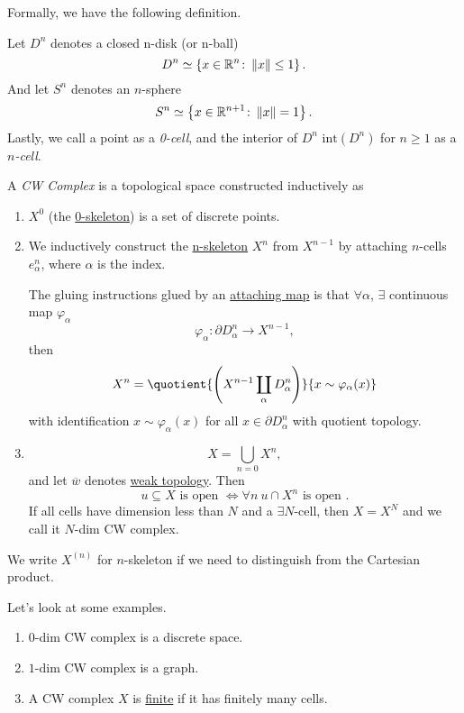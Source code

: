 \hr

Formally, we have the following definition.
\begin{notation}
	Let \(D^n\) denotes a closed n-disk (or n-ball)
	\[
		D^n\simeq \left\{x\in\mathbb{\MakeUppercase{R}} ^n\colon \left\lVert x\right\rVert \leq 1\right\}.
	\]
	And let \(S^n\) denotes an \(n\)-sphere
	\[
		S^n\simeq \left\{x\in \mathbb{\MakeUppercase{R}}^{n+1}\colon \left\lVert x\right\rVert = 1\right\}.
	\]
	Lastly, we call a point as a \emph{0-cell}, and the interior of \(D^n\) \(\mathrm{int}(D^n)\) for \(n\geq 1\) as a \emph{\(n\)-cell}.
\end{notation}
\begin{definition}[CW Complex]
	A \emph{CW Complex} is a topological space constructed inductively as
	\begin{enumerate}
		\item \(X^0\) (the \underline{0-skeleton}) is a set of discrete points.
		\item We inductively construct the \underline{n-skeleton} \(X^n\) from \(X^{n-1}\) by attaching \(n\)-cells \(e^n_{\alpha}\), where
		      \(\alpha\) is the index.
		      \par The gluing instructions glued by an \underline{attaching map} is that \(\forall \alpha\), \(\exists \) continuous map \(\varphi_{\alpha}\)
		      \[
			      \varphi_{\alpha}\colon \partial D^n_{\alpha}\to X^{n-1},
		      \]
		      then
		      \[
			      X^n = \quotient{\left(X^{n-1}\coprod\limits_{\alpha}D^n_\alpha\right)}{x\sim \varphi_{\alpha}(x)}
		      \]
		      with identification \(x\sim \varphi_{\alpha}(x)\) for all \(x\in \partial D^n_{\alpha}\) with quotient topology.
		\item
		      \[
			      X = \bigcup\limits_{n=0} X^n,
		      \]
		      and let \(\overline{w} \) denotes \underline{weak topology}. Then
		      \[
			      u\subseteq X \text{ is open }\iff \forall n\ u\cap X^n \text{ is open }.
		      \]
		      If all cells have dimension less than \(N\) and a \(\exists N\)-cell, then \(X = X^N\) and we call it \(N\)-dim CW complex.
	\end{enumerate}
\end{definition}

\begin{remark}
	We write \(X^{(n)}\) for \(n\)-skeleton if we need to distinguish from the Cartesian product.
\end{remark}

\begin{eg}
	Let's look at some examples.
	\begin{enumerate}
		\item \(0\)-dim CW complex is a discrete space.
		\item \(1\)-dim CW complex is a graph.
		\item A CW complex \(X\) is \underline{finite} if it has finitely many cells.
	\end{enumerate}
\end{eg}

